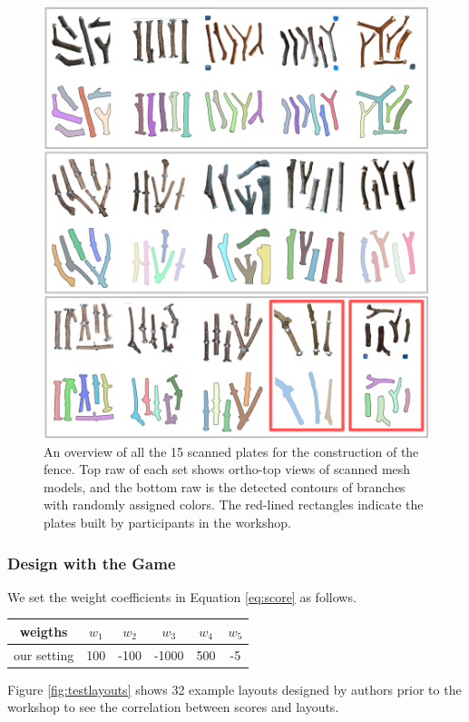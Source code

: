 \begin{figure}[ht]
  \begin{center}
    \includegraphics[width = 0.4\paperwidth]{images/fabrication/all_plates.png}
    \caption{An overview of all the 15 scanned plates for the construction of the fence. Top raw of each set shows ortho-top views of scanned mesh models, and the bottom raw is the detected contours of branches with randomly assigned colors. The red-lined rectangles indicate the plates built by participants in the workshop.}
    \label{fig:scannedplates}
  \end{center}
\end{figure}


\subsubsection*{Design with the Game}

We set the weight coefficients in Equation \ref{eq:score} as follows.
\begin{center}
	\begin{tabulary}{\columnwidth}{ |C||C|C|C|C|C| }
		\hline
		weigths & $w_1$ & $w_2$ & $w_3$ & $w_4$ & $w_5$ \\
		\hline
		our setting & 100 & -100 & -1000 & 500 & -5 \\
		\hline
	\end{tabulary}
	\label{tab:weights}
\end{center}
Figure \ref{fig:testlayouts} shows 32 example layouts designed by authors prior to the workshop to see the correlation between scores and layouts.

